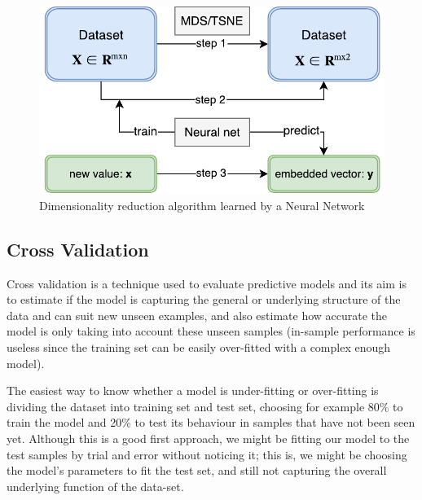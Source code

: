 \documentclass[a4paper,11pt,spanish]{report}
\begin{document}
\begin{figure}[h]
\centering
\includegraphics[width=12cm]{figures/neuralnet.pdf}
\caption{\label{figurenet}Dimensionality reduction algorithm learned by a Neural Network}
\end{figure}

\subsection{Cross Validation}
\label{sec:cv}

Cross validation is a technique used to evaluate predictive models and its aim is to estimate if the model is capturing the general or underlying structure of the data and can suit new unseen examples, and also estimate how accurate the model is only taking into account these unseen samples (in-sample performance is useless since the training set can be easily over-fitted with a complex enough model).

The easiest way to know whether a model is under-fitting or over-fitting is dividing the dataset into training set and test set, choosing for example 80\% to train the model and 20\% to test its behaviour in samples that have not been seen yet. Although this is a good first approach, we might be fitting our model to the test samples by trial and error without noticing it; this is, we might be choosing the model's parameters to fit the test set, and still not capturing the overall underlying function of the data-set.
\end{document}
